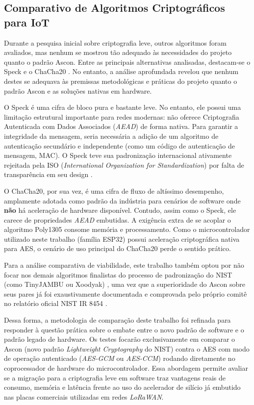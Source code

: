 
\subsection{Comparativo de Algoritmos Criptográficos para IoT}
Durante a pesquisa inicial sobre criptografia leve, outros algoritmos foram avaliados, mas nenhum se mostrou tão adequado às necessidades do projeto quanto o padrão Ascon. Entre as principais alternativas analisadas, destacam-se o Speck  e o ChaCha20 . No entanto, a análise aprofundada revelou que nenhum destes se adequava às premissas metodológicas e práticas do projeto quanto o padrão Ascon e as soluções nativas em hardware.

O Speck é uma cifra de bloco pura e bastante leve. No entanto, ele possui uma limitação estrutural importante para redes modernas: não oferece Criptografia Autenticada com Dados Associados (\textit{AEAD}) de forma nativa. Para garantir a integridade da mensagem, seria necessária a adição de um algoritmo de autenticação secundário e independente (como um código de autenticação de mensagem, MAC). O Speck teve sua padronização internacional ativamente rejeitada pela ISO (\textit{International Organization for Standardization}) por falta de transparência em seu design \cite{register2018nsa}.

O ChaCha20, por sua vez, é uma cifra de fluxo de altíssimo desempenho, amplamente adotada como padrão da indústria para cenários de software onde \textbf{não} há aceleração de hardware disponível. Contudo, assim como o Speck, ele carece de propriedades \textit{AEAD} embutidas. A exigência extra de se acoplar o algoritmo Poly1305 consome memória e processamento. Como o microcontrolador utilizado neste trabalho (família ESP32) possui aceleração criptográfica nativa para AES, o cenário de uso principal do ChaCha20 perde o sentido prático.

Para a análise comparativa de viabilidade, este trabalho também optou por não focar nos demais algoritmos finalistas do processo de padronização do NIST (como TinyJAMBU ou Xoodyak) , uma vez que a superioridade do Ascon sobre seus pares já foi exaustivamente documentada e comprovada pelo próprio comitê no relatório oficial NIST IR 8454 \cite{nistir8454}.

Dessa forma, a metodologia de comparação deste trabalho foi refinada para responder à questão prática sobre o embate entre o novo padrão de software e o padrão legado de hardware. Os testes focarão exclusivamente em comparar o Ascon (novo padrão \textit{Lightweight Cryptography} do NIST) contra o AES com modo de operação autenticado (\textit{AES-GCM} ou \textit{AES-CCM}) rodando diretamente no coprocessador de hardware do microcontrolador. Essa abordagem permite avaliar se a migração para a criptografia leve em software traz vantagens reais de consumo, memória e latência frente ao uso do acelerador de silício já embutido nas placas comerciais utilizadas em redes \textit{LoRaWAN}.


